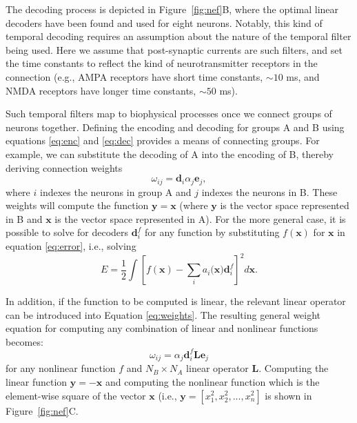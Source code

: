 \documentclass{frontiersSCNS}
\begin{document}
The decoding process is depicted
in Figure~\ref{fig:nef}B,
where the optimal linear decoders
have been found and used for eight neurons.
Notably, this kind of temporal decoding
requires an assumption about
the nature of the temporal filter being used.
Here we assume that post-synaptic currents
are such filters, and set the time constants
to reflect the kind of neurotransmitter receptors
in the connection
(e.g., AMPA receptors have short time constants, $\sim10$ ms,
and NMDA receptors have longer time constants, $\sim50$ ms).

Such temporal filters map
to biophysical processes
once we connect groups of neurons together.
Defining the encoding and decoding for
groups A and B using equations
\eqref{eq:enc} and \eqref{eq:dec}
provides a means of connecting groups.
For example, we can substitute
the decoding of A into the encoding of B,
thereby deriving connection weights
\begin{equation} \label{eq:weights}
  \omega_{ij}=\mathbf{d}_{i}\alpha_{j}\mathbf{e}_{j},
\end{equation}
where $i$ indexes the neurons in group A
and $j$ indexes the neurons in B.
These weights will compute the function
$\mathbf{y}=\mathbf{x}$
(where $\mathbf{y}$ is the vector space
represented in B and $\mathbf{x}$
is the vector space represented in A).
For the more general case,
it is possible to solve for decoders
$\mathbf{d}_{i}^{f}$
for any function by substituting
$f(\mathbf{x})$ for $\mathbf{x}$
in equation \eqref{eq:error}, i.e., solving
\begin{equation} \label{eq:error-fcns}
E=\frac{1}{2}\int[f(\mathbf{x})-\sum_{i}a_{i}(\mathbf{x)}\mathbf{d}_{i}^{f}]^{2}d\mathbf{x}.
\end{equation}

In addition, if the function to be computed is linear,
the relevant linear operator can be introduced
into Equation \eqref{eq:weights}.
The resulting general weight equation
for computing any combination
of linear and nonlinear functions becomes:
\begin{equation} \label{eq:weights-general}
  \omega_{ij}=\alpha_{j}\mathbf{d}_{i}^{f}\mathbf{L}\mathbf{e}_{j}
\end{equation}
for any nonlinear function $f$ and
$N_{B}\times N_{A}$ linear operator $\mathbf{L}$.
Computing the linear function
$\mathbf{y}=\mathbf{-x}$ and
computing the nonlinear function
which is the element-wise
square of the vector $\mathbf{x}$
(i.e., $\mathbf{y}=[x_{1}^{2},x_{2}^{2},...,x_{n}^{2}]$
is shown in Figure~\ref{fig:nef}C.
\end{document}
